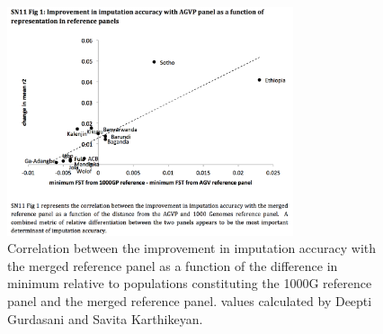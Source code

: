 \begin{figure}
\centering
\includegraphics[trim={0 3.5cm 0cm 1.25cm},clip,width=0.75\textwidth]{fig/SN11f1}
\caption[
Improvement in imputation accuracy for each population using two different reference panels as a function of difference in minimum  between each population in either of the two reference panels.]{
Correlation between the improvement in imputation accuracy with the merged reference panel as a function of the difference in minimum  relative to populations constituting the \gls{1000G} reference panel and the merged reference panel.  values calculated by Deepti Gurdasani and Savita Karthikeyan.}
\label{fig:SN11f1}
\end{figure}